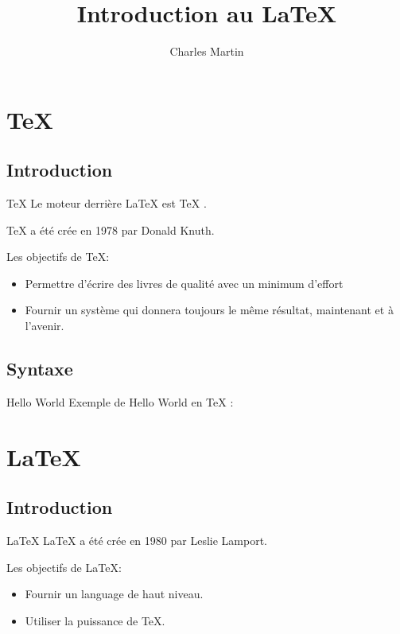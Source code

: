 \documentclass{beamer}
\title{Introduction au \LaTeX}
\author{Charles Martin}
\begin{document}




\section{\TeX}	
\subsection{Introduction}
\begin{frame}{\TeX}
  Le moteur derrière \LaTeX{} est \TeX{} .
  
  \TeX{} a été crée en 1978 par Donald Knuth.
  \begin{block}{Les objectifs de \TeX :}    
   \begin{itemize}
    \item Permettre d’écrire des livres de qualité avec un minimum d’effort
    \item Fournir un système qui donnera toujours le même résultat, maintenant et à l’avenir.
   \end{itemize}
  \end{block}
\end{frame}

\subsection{Syntaxe}
\begin{frame}{Hello World}
	Exemple de Hello World en \TeX{} :
    
\end{frame}

\section{\LaTeX}
\subsection{Introduction}
\begin{frame}{\LaTeX}
  \LaTeX{} a été crée en 1980 par Leslie Lamport.
  \begin{block}{Les objectifs de \LaTeX :}    
   \begin{itemize}
    \item Fournir un language de haut niveau.
    \item Utiliser la puissance de \TeX{}.
   \end{itemize}
  \end{block}
\end{frame}
\end{document}
